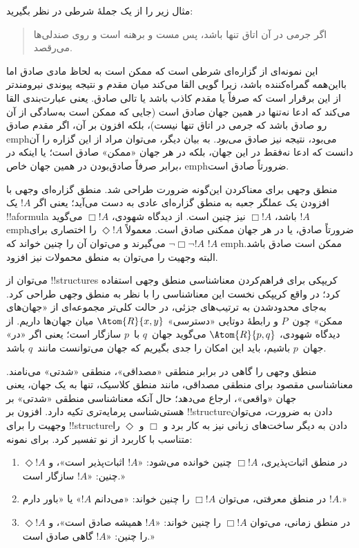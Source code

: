 \documentclass[../../../include/open-logic-section]{subfiles}
\begin{document}


مثال زیر را از یک جملهٔ شرطی در نظر بگیرید:
\begin{quote}
  اگر جرمی در آن اتاق تنها باشد، پس مست و برهنه است و روی صندلی‌ها
  می‌رقصد.
\end{quote}
این نمونه‌ای از گزاره‌ای شرطی است که ممکن است به لحاظ مادی صادق اما
بااین‌همه گمراه‌کننده باشد، زیرا گویی القا می‌کند میان مقدم و نتیجه
پیوندی نیرومندتر از این برقرار است که صرفاً یا مقدم کاذب باشد یا تالی
صادق. یعنی عبارت‌بندی القا می‌کند که ادعا نه‌تنها در همین جهان صادق است
(جایی که ممکن است به‌سادگی از آن رو صادق باشد که جرمی در اتاق تنها
نیست)، بلکه افزون بر آن، اگر مقدم صادق emph{می‌بود}، نتیجه نیز صادق
\emph{می‌بود}. به بیان دیگر، می‌توان مراد از این گزاره را آن دانست که
ادعا نه‌فقط در این جهان، بلکه در هر جهان «ممکن» صادق است؛ یا اینکه در
برابر صرفاً صادق‌بودن در همین جهان خاص، emph{ضرورتاً} صادق است.

منطق وجهی برای معناکردن این‌گونه ضرورت طراحی شد. منطق گزاره‌ای وجهی با
افزودن یک عملگر جعبه به منطق گزاره‌ای عادی به دست می‌آید؛ یعنی اگر
$!A$ یک !!a{formula} باشد، $\Box !A$ نیز چنین است. از دیدگاه شهودی،
$\Box !A$ می‌گوید $!A$ emph{ضرورتاً} صادق، یا در هر جهان ممکنی صادق
است. معمولاً $\Diamond !A$ را اختصاری برای $\lnot \Box \lnot !A$
می‌گیرند و می‌توان آن را چنین خواند که $!A$ emph{ممکن است} صادق باشد.
البته وجهیت را می‌توان به منطق محمولات نیز افزود.

می‌توان از !!{structure}s کریپکی برای فراهم‌کردن معناشناسی منطق وجهی
استفاده کرد؛ در واقع کریپکی نخست این معناشناسی را با نظر به منطق وجهی
طراحی کرد. به‌جای محدودشدن به ترتیب‌های جزئی، در حالت کلی‌تر مجموعه‌ای
از «جهان‌های ممکن» چون~$P$ و رابطهٔ دوتایی «دسترسی»
$\Atom{R}{x,y}$ میان جهان‌ها داریم. از دیدگاه شهودی، $\Atom{R}{p,q}$
می‌گوید جهان~$q$ با~$p$ سازگار است؛ یعنی اگر «در» جهان~$p$ باشیم، باید
این امکان را جدی بگیریم که جهان می‌توانست مانند~$q$ باشد.

منطق وجهی را گاهی در برابر منطقی «مصداقی»، منطقی «شدتی» می‌نامند.
معناشناسی مقصود برای منطقی مصداقی، مانند منطق کلاسیک، تنها به یک جهان،
یعنی جهان «واقعی»، ارجاع می‌دهد؛ حال آنکه معناشناسی منطقی «شدتی» بر
هستی‌شناسی پرمایه‌تری تکیه دارد. افزون بر !!{structure}دادن به ضرورت،
می‌توان وجهیت را برای !!{structure}دادن به دیگر ساخت‌های زبانی نیز به
کار برد و $\Box$ و $\Diamond$ را متناسب با کاربرد از نو تفسیر کرد.
برای نمونه:
\begin{enumerate}
\item در منطق اثبات‌پذیری، $\Box !A$ چنین خوانده می‌شود: «$!A$
  اثبات‌پذیر است»، و $\Diamond !A$ چنین: «$!A$ سازگار است.»
\item در منطق معرفتی، می‌توان $\Box !A$ را چنین خواند: «می‌دانم
  $!A$» یا «باور دارم $!A$.»
\item در منطق زمانی، می‌توان $\Box !A$ را چنین خواند: «$!A$ همیشه
  صادق است»، و $\Diamond !A$ را چنین: «$!A$ گاهی صادق است.»
\end{enumerate}
\end{document}
